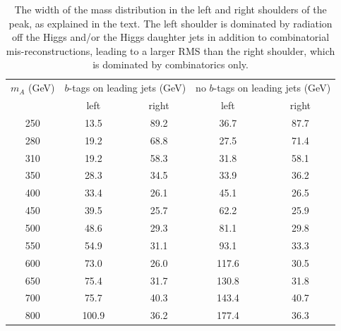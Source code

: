 \begin{table}
\centering
\caption{The width of the mass distribution in the left and right shoulders of the peak,
    as explained in the text.  The left shoulder is dominated by radiation off the Higgs
    and/or the Higgs daughter jets in addition to combinatorial mis-reconstructions,
    leading to a larger RMS than the right shoulder, which
    is dominated by combinatorics only.\label{tab:signal_mass_RMS_compare}   }
  \begin{tabular}{ccccc}
     \hline \hline
     $m_A$ (GeV) & \multicolumn{2}{c}{$b$-tags on leading jets (GeV)} & \multicolumn{2}{c}{no $b$-tags on leading jets (GeV)}  \\
        & left & right & left & right \\ \hline
     250 & 13.5 & 89.2 & 36.7 & 87.7 \\
     280 & 19.2 & 68.8 & 27.5 & 71.4 \\
     310 & 19.2 & 58.3 & 31.8 & 58.1 \\
     350 & 28.3 & 34.5 & 33.9 & 36.2 \\
     400 & 33.4 & 26.1 & 45.1 & 26.5 \\
     450 & 39.5 & 25.7 & 62.2 & 25.9 \\
     500 & 48.6 & 29.3 & 81.1 & 29.8 \\
     550 & 54.9 & 31.1 & 93.1 & 33.3 \\
     600 & 73.0 & 26.0 & 117.6 & 30.5 \\
     650 & 75.4 & 31.7 & 130.8 & 31.8 \\
     700 & 75.7 & 40.3 & 143.4 & 40.7 \\
     800 & 100.9 & 36.2 & 177.4 & 36.3 \\
     \hline     \end{tabular}
\end{table}






